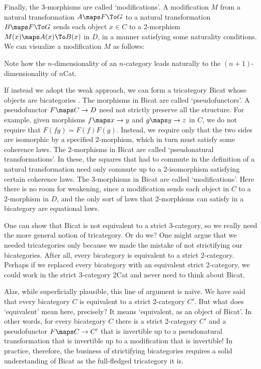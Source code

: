 \medskip
\centerline{\epsfysize=2.0in}
\medskip

\noindent Finally, the 3-morphisms are called `modifications'.  A
modification $M$ from a natural transformation $A \maps F \To G$ to a
natural transformation $B \maps F \To G$ sends each object $x \in C$ to
a 2-morphism $M(x) \maps A(x) \To B(x)$ in $D$, in a manner satisfying
some naturality conditions.  We can visualize a modification $M$ as
follows:

\medskip
\centerline{\epsfysize=2.2in}
\medskip

\noindent Note how the $n$-dimensionality of an $n$-category leads
naturally to the $(n+1)$-dimensionality of $n$Cat.  

If instead we adopt the weak approach, we can form a tricategory Bicat
whose objects are bicategories \cite{GPS}.  The morphisms in Bicat are
called `pseudofunctors'.  A pseudofunctor $F \maps C \to D$ need not
strictly preserve all the structure.  For example, given morphisms $f
\maps x \to y$ and $g \maps y \to z$ in $C$, we do not require that
$F(fg) = F(f)F(g)$.  Instead, we require only that the two sides are
isomorphic by a specified 2-morphism, which in turn must satisfy some
coherence laws.  The 2-morphisms in Bicat are called `pseudonatural
transformations'.  In these, the squares that had to commute in the
definition of a natural transformation need only commute up to a
2-isomorphism satisfying certain coherence laws.  The 3-morphisms in
Bicat are called `modifications'.  Here there is no room for weakening,
since a modification sends each object in $C$ to a 2-morphism in $D$,
and the only sort of laws that 2-morphisms can satisfy in a bicategory
are equational laws.

One can show that Bicat is not equivalent to a strict 3-category, so we
really need the more general notion of tricategory.  Or do we?  One
might argue that we needed tricategories only because we made the
mistake of not strictifying our bicategories.  After all, every
bicategory is equivalent to a strict 2-category.  Perhaps if we replaced
every bicategory with an equivalent strict 2-category, we could work in
the strict 3-category 2Cat and never need to think about Bicat.

Alas, while superficially plausible, this line of argument is naive.  We
have said that every bicategory $C$ is equivalent to a strict 2-category $C'$.
But what does `equivalent' mean here, precisely?  It means
`equivalent, as an object of Bicat'.  In other words, for every
bicategory $C$ there is a strict 2-category $C'$ and a pseudofunctor $F
\maps C \to C'$ that is invertible up to a pseudonatural transformation
that is invertible up to a modification that is invertible!  In practice,
therefore, the business of strictifying bicategories requires a solid
understanding of Bicat as the full-fledged tricategory it is.

